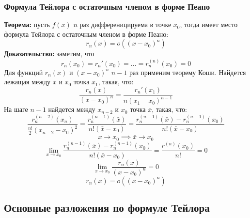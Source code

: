 \documentclass{article}
\newcommand{\theorem}{\textbf{Теорема:} }
\newcommand{\proof}{\textbf{Доказательство:} }
\begin{document}
        \subsubsection*{Формула Тейлора с остаточным членом в форме Пеано}
        \theorem пусть $f(x)$ $n$ раз дифференицируема в точке $x_0$, тогда имеет место формула Тейлора с остаточным членом в форме Пеано:
        \[ r_n(x) = o \left((x - x_0)^{n} \right) \]
        \proof
        заметим, что 
        \[ r_n(x_0) = r_n'(x_0) = ... = r_n^{(n)}(x_0) = 0 \]
        Для функций $r_n(x)$ и $(x - x_0)^n$ $n - 1$ раз применим теорему Коши.
        Найдется лежащая между $x$ и $x_0$ точка $x_1$, такая, что:
        \[ \frac{r_n(x)}{(x - x_0)^n} = \frac{r_n'(x_1)}{n(x_1 - x_0)^{n - 1}} \]
        На шаге $n - 1$ найдется между $x_{n - 2}$ и $x_0$ точка $\bar x$, такая, что:
        \[ \frac{r_n^{(n - 2)}(x_n)}{\frac{n!}{2}(x_{n - 2} - x_0)^2} = \frac{r_n^{(n - 1)}(\bar x)}{n!(\bar x - x_0)} =
           \frac{r_n^{(n - 1)}(\bar x) - r_n^{(n - 1)}(x_0)}{n!(\bar x - x_0)} \]
        \[ x \to x_0 \implies \bar x \to x_0 \]
        \[ \lim_{x \to x_0} \frac{r_n^{(n - 1)}(\bar x) - r_n^{(n - 1)}(x_0)}{n!(\bar x - x_0)} = \frac{r^{(n)}(x_0)}{n!} = 0 \]
        \[ \lim_{x \to x_0} \frac{r_n(x)}{(x - x_0)^n} = 0 \]
        \[ r_n(x) = o \left( (x - x_0)^n \right) \]
        

    \subsection*{Основные разложения по формуле Тейлора}
\end{document}
